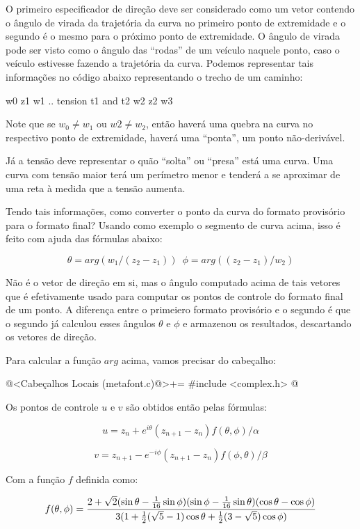 O primeiro especificador de direção deve ser considerado como um vetor
contendo o ângulo de virada da trajetória da curva no primeiro ponto
de extremidade e o segundo é o mesmo para o próximo ponto de
extremidade. O ângulo de virada pode ser visto como o ângulo das
``rodas'' de um veículo naquele ponto, caso o veículo estivesse
fazendo a trajetória da curva. Podemos representar tais informações no
código abaixo representando o trecho de um caminho:

\alinhaverbatim
{w0} z1 {w1} .. tension t1 and t2 {w2} z2 {w3} 
\alinhanormal

Note que se $w_0\neq w_1$ ou $w2 \neq w_2$, então haverá uma quebra na
curva no respectivo ponto de extremidade, haverá uma ``ponta'', um
ponto não-derivável.

Já a tensão deve representar o quão ``solta'' ou ``presa'' está uma
curva. Uma curva com tensão maior terá um perímetro menor e tenderá a
se aproximar de uma reta à medida que a tensão aumenta.

Tendo tais informações, como converter o ponto da curva do formato
provisório para o formato final? Usando como exemplo o segmento de
curva acima, isso é feito com ajuda das fórmulas abaixo:

$$
\theta = arg(w_1/(z_2-z_1))\,\,\,\phi = arg((z_2-z_1)/w_2)
$$

Não é o vetor de direção em si, mas o ângulo computado acima de tais
vetores que é efetivamente usado para computar os pontos de controle
do formato final de um ponto. A diferença entre o primeiero formato
provisório e o segundo é que o segundo já calculou esses ângulos
$\theta$ e $\phi$ e armazenou os resultados, descartando os vetores de
direção.

Para calcular a função $arg$ acima, vamos precisar do cabeçalho:

\iniciocodigo
@<Cabeçalhos Locais (metafont.c)@>+=
#include <complex.h>
@
\fimcodigo

Os pontos de controle $u$ e $v$ são obtidos então pelas fórmulas:

$$
u = z_{n} + e^{i\theta}(z_{n+1}-z_n)f(\theta, \phi)/\alpha
$$

$$
v = z_{n+1} - e^{-i\phi}(z_{n+1}-z_n)f(\phi, \theta)/\beta
$$

Com a função $f$ definida como:

$$
f(\theta, \phi) = {{2+\sqrt{2}(\sin\theta-{{1}\over{16}}\sin\phi)(\sin\phi-{{1}\over{16}}\sin\theta)(\cos\theta-\cos\phi)}\over{3(1+{1\over 2}(\sqrt 5 - 1)\cos\theta+{1\over 2}(3-\sqrt 5)\cos\phi)}}
$$

